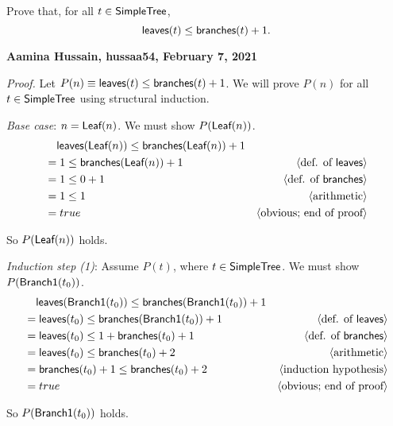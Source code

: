 \documentclass[11pt,fleqn]{article}
\newcommand{\mname}[1]{\mbox{\sf #1}}
\newcommand{\pnote}[1]{{\langle \text{#1} \rangle}}
\begin{document}
  Prove that, for all $t \in \mname{SimpleTree}$, \[\mname{leaves}(t) \le
  \mname{branches}(t) + 1.\]

  \textbf{Aamina Hussain, hussaa54, February 7, 2021}

  \emph{Proof.} Let $P(n) \equiv \mname{leaves}(t) \le \mname{branches}(t)+1$. We will prove $P(n)$ for all $t \in \mname{SimpleTree}$ using structural induction.
  
  \medskip

  \emph{Base case}: $n = \mname{Leaf}(n)$.  We must show $P(\mname{Leaf}(n))$.
  \begin{align*}
    &\phantom{{}=}\mname{leaves}(\mname{Leaf}(n)) \le \mname{branches}(\mname{Leaf}(n))+1 \\
    &= 1 \le \mname{branches}(\mname{Leaf}(n))+1  & \pnote{def. of $\mname{leaves}$}\\
    &= 1 \le 0 + 1 & \pnote{def. of $\mname{branches}$}\\
    &= 1 \le 1  & \pnote{arithmetic}\\
    &= true    & \pnote{obvious; end of proof}\\
  \end{align*}

  So $P(\mname{Leaf}(n))$ holds.

  \medskip

  \emph{Induction step (1)}: Assume $P(t)$, where $t \in \mname{SimpleTree}$. We must show $P(\mname{Branch1}(t_0))$.
  \begin{align*}
    &\phantom{{}=}\mname{leaves}(\mname{Branch1}(t_0)) \le \mname{branches}(\mname{Branch1}(t_0))+1 \\
    &= \mname{leaves}(t_0) \le \mname{branches}(\mname{Branch1}(t_0))+1  & \pnote{def. of $\mname{leaves}$}\\
    &= \mname{leaves}(t_0) \le 1 + \mname{branches}(t_0)+1 & \pnote{def. of $\mname{branches}$}\\
    &= \mname{leaves}(t_0) \le \mname{branches}(t_0)+2  & \pnote{arithmetic}\\
    &= \mname{branches}(t_0)+1 \le \mname{branches}(t_0)+2  & \pnote{induction hypothesis}\\
    &= true    & \pnote{obvious; end of proof}\\
  \end{align*}

  So $P(\mname{Branch1}(t_0))$ holds.\\

  \medskip
\end{document}
